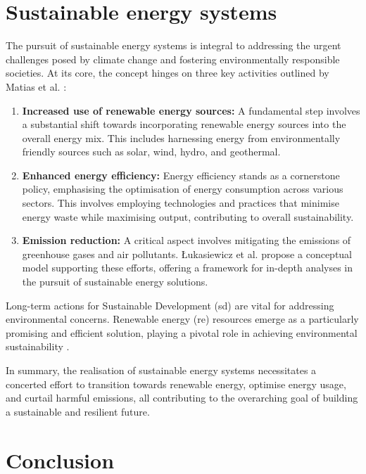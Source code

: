 \section{Sustainable energy systems}

The pursuit of sustainable energy systems is integral to addressing the urgent challenges posed by climate change and fostering environmentally responsible societies. 
At its core, the concept hinges on three key activities outlined by Matias et al. \cite{Matias2020}:
\begin{enumerate}
  \item \textbf{Increased use of renewable energy sources:} A fundamental step involves a substantial shift towards incorporating renewable energy sources into the overall energy mix. This includes harnessing energy from environmentally friendly sources such as solar, wind, hydro, and geothermal.
  \item \textbf{Enhanced energy efficiency:} Energy efficiency stands as a cornerstone policy, emphasising the optimisation of energy consumption across various sectors. This involves employing technologies and practices that minimise energy waste while maximising output, contributing to overall sustainability.
  \item \textbf{Emission reduction:} A critical aspect involves mitigating the emissions of greenhouse gases and air pollutants. Łukasiewicz et al. \cite{Lukasiewicz2022} propose a conceptual model supporting these efforts, offering a framework for in-depth analyses in the pursuit of sustainable energy solutions.
\end{enumerate}

Long-term actions for Sustainable Development (\gls{sd}) are vital for addressing environmental concerns. 
Renewable energy (\gls{re}) resources emerge as a particularly promising and efficient solution, playing a pivotal role in achieving environmental sustainability \cite{Shoeib2021}.

In summary, the realisation of sustainable energy systems necessitates a concerted effort to transition towards renewable energy, optimise energy usage, and curtail harmful emissions, all contributing to the overarching goal of building a sustainable and resilient future.


\section{Conclusion}

